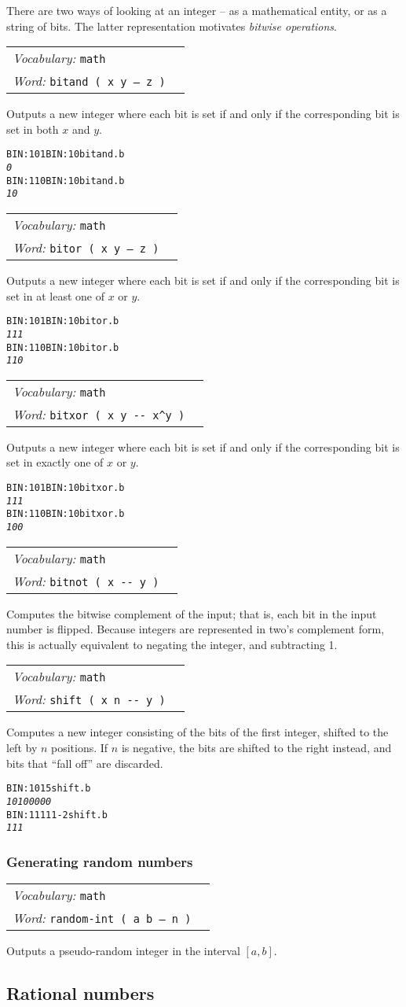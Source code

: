 \documentclass{book}
\newcommand{\vocabulary}[1]{\emph{Vocabulary:} \texttt{#1}&\\}
\newcommand{\ordinaryword}[2]{\index{\texttt{#1}}\emph{Word:} \texttt{#2}&\\}
\newcommand{\wordtable}[1]{

\begin{tabularx}{12cm}[t]{lX}
\hline
#1
\hline
\end{tabularx}

}
\begin{document}
There are two ways of looking at an integer -- as a mathematical entity, or as a string of bits. The latter representation motivates \emph{bitwise operations}.
\wordtable{
\vocabulary{math}
\ordinaryword{bitand}{bitand ( x y -- z )}
}
Outputs a new integer where each bit is set if and only if the corresponding bit is set in both $x$ and $y$.
\begin{alltt}
BIN: 101 BIN: 10 bitand .b
\emph{0}
BIN: 110 BIN: 10 bitand .b
\emph{10}
\end{alltt}
\wordtable{
\vocabulary{math}
\ordinaryword{bitor}{bitor ( x y -- z )}
}
Outputs a new integer where each bit is set if and only if the corresponding bit is set in at least one of $x$ or $y$.
\begin{alltt}
BIN: 101 BIN: 10 bitor .b
\emph{111}
BIN: 110 BIN: 10 bitor .b
\emph{110}
\end{alltt}
\wordtable{
\vocabulary{math}
\ordinaryword{bitxor}{bitxor ( x y -{}- x\^{}y )}
}
Outputs a new integer where each bit is set if and only if the corresponding bit is set in exactly one of $x$ or $y$.
\begin{alltt}
BIN: 101 BIN: 10 bitxor .b
\emph{111}
BIN: 110 BIN: 10 bitxor .b
\emph{100}
\end{alltt}
\wordtable{
\vocabulary{math}
\ordinaryword{bitnot}{bitnot ( x -{}- y )}
}
Computes the bitwise complement of the input; that is, each bit in the input number is flipped. Because integers are represented in two's complement form, this is actually equivalent to negating the integer, and subtracting 1.
\wordtable{
\vocabulary{math}
\ordinaryword{shift}{shift ( x n -{}- y )}
}
Computes a new integer consisting of the bits of the first integer, shifted to the left by $n$ positions. If $n$ is negative, the bits are shifted to the right instead, and bits that ``fall off'' are discarded.
\begin{alltt}
BIN: 101 5 shift .b
\emph{10100000}
BIN: 11111 -2 shift .b
\emph{111}
\end{alltt}

\subsubsection{Generating random numbers}

\wordtable{
\vocabulary{math}
\ordinaryword{random-int}{random-int ( a b -- n )}
}
Outputs a pseudo-random integer in the interval $[a,b]$.

\subsection{\label{ratios}Rational numbers}
\end{document}
